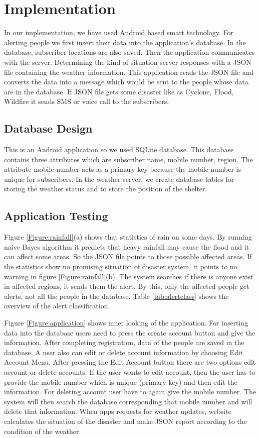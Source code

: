 \documentclass[conference]{IEEEtran}
\begin{document}
\section {Implementation}
\label{implementation}

In our implementation, we have used Android based smart technology. For alerting people we first insert their data into the application’s database. In the database, subscriber locations are also saved. Then the application communicates with the server. Determining the kind of situation server responses with a JSON file containing the weather information. This application reads the JSON file and converts the data into a message which would be sent to the people whose data are in the database. If JSON file gets some disaster like as Cyclone, Flood, Wildfire it sends SMS or voice call to the subscribers.   


\subsection{Database Design}

This is an Android application so we used SQLite database\cite{junyan2009application}. This database contains three attributes which are subscriber name, mobile number, region. The attribute mobile number acts as a primary key because the mobile number is unique for subscribers.  In the weather server, we create database tables for storing the weather status and to store the position of the shelter.
\subsection{Application Testing}

Figure \ref{Figure:rainfall}(a) shows that statistics of rain on some days. By running naive Bayes algorithm it predicts that heavy rainfall may cause the flood and it can affect some areas. So the JSON file points to those possible affected areas. If the statistics show no promising situation of disaster system, it points to no warning in figure \ref{Figure:rainfall}(b). The system searches if there is anyone exist in affected regions, it sends them the alert. By this, only the affected people get alerts, not all the people in the database. Table \ref{tab:alertclass} shows the overview of the alert classification.


Figure \ref{Figure:application} shows inner looking of the application. For inserting data into the database users need to press the create account button and give the information. After completing registration, data of the people are saved in the database. A user also can edit or delete account information by choosing Edit Account Menu. After pressing the Edit Account button there are two options edit account or delete accounts. If the user wants to edit account, then the user has to provide the mobile number which is unique (primary key) and then edit the information. For deleting account user have to again give the mobile number. The system will then search the database corresponding that mobile number and will delete that information. When apps requests for weather updates, website calculates the situation of the disaster and make JSON report according to the condition of the weather.
\end{document}
